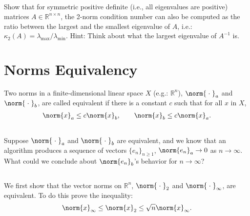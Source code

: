 \documentclass[11pt,letterpaper]{report}
\begin{document}

\subsection{}
Show that for symmetric positive definite (i.e., all eigenvalues
  are positive) matrices $A\in \mathbb R^{n\times n}$, the 2-norm
  condition number can also be computed as the ratio between the
  largest and the smallest eigenvalue of $A$, i.e.:
  $\kappa_2(A)=\lambda_{\max}/\lambda_{\min}$. Hint: Think about what
  the largest eigenvalue of $A^{-1}$ is.

\section{Norms Equivalency}
Two norms in a finite-dimensional linear space $X$ (e.g.: $\mathbb{R}^n$), $\norm{\;\cdot\;}_a$ and $\norm{\;\cdot\;}_b$, are called equivalent if there is a constant $c$ such that for all $x$ in $X$,
\begin{align}
    \norm{x}_a\leq c\norm{x}_b,\qquad \norm{x}_b\leq c\norm{x}_a.\label{eq:norm_equiv}
\end{align}

\subsection{}
Suppose $\norm{\;\cdot\;}_a$ and $\norm{\;\cdot\;}_b$ are equivalent, and we know that an algorithm produces a sequence of vectors $\{e_n\}_{n\geq 1}$, $\norm{e_n}_a\to 0$ as $n\to\infty$. What could we conclude about $\norm{e_n}_b$'s behavior for $n\to\infty$?

\subsection{}
We first show that the vector norms on $\mathbb{R}^n$, $\norm{\;\cdot\;}_{2}$ and $\norm{\;\cdot\;}_{\infty}$, are equivalent. To do this prove the inequality:
\begin{align*}
    \norm{x}_\infty \leq \norm{x}_2 \leq \sqrt{n}\norm{x}_\infty.
\end{align*}
\end{document}
